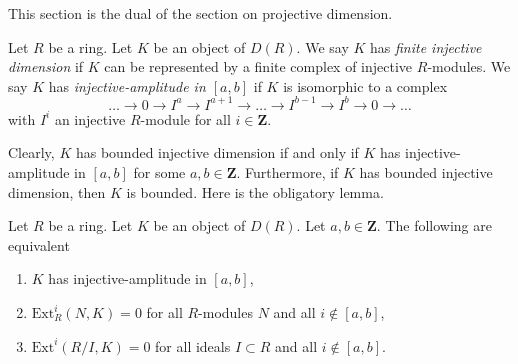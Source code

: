 \noindent
This section is the dual of the section on projective dimension.

\begin{definition}
\label{definition-injective-dimension}
Let $R$ be a ring. Let $K$ be an object of $D(R)$.
We say $K$ has {\it finite injective dimension} if $K$ can be
represented by a finite complex of injective $R$-modules.
We say $K$ has {\it injective-amplitude in $[a, b]$}
if $K$ is isomorphic to a complex
$$
\ldots \to 0 \to I^a \to I^{a + 1} \to \ldots \to
I^{b - 1} \to I^b \to 0 \to \ldots
$$
with $I^i$ an injective $R$-module for all $i \in \mathbf{Z}$.
\end{definition}

\noindent
Clearly, $K$ has bounded injective dimension if and only if $K$
has injective-amplitude in $[a, b]$ for some $a, b \in \mathbf{Z}$.
Furthermore, if $K$ has bounded injective dimension, then $K$
is bounded. Here is the obligatory lemma.

\begin{lemma}
\label{lemma-injective-amplitude}
Let $R$ be a ring. Let $K$ be an object of $D(R)$. Let $a, b \in \mathbf{Z}$.
The following are equivalent
\begin{enumerate}
\item $K$ has injective-amplitude in $[a, b]$,
\item $\text{Ext}^i_R(N, K) = 0$ for all $R$-modules $N$ and all
$i \not \in [a, b]$,
\item $\text{Ext}^i(R/I, K) = 0$ for all ideals $I \subset R$ and
all $i \not \in [a, b]$.
\end{enumerate}
\end{lemma}

